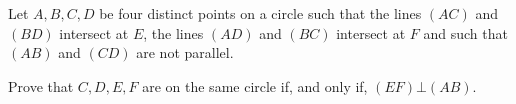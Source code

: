 Let $A,B,C,D$ be four distinct points on a circle such that the lines $(AC)$ and $(BD)$ intersect at $E$,  the lines $(AD)$ and $(BC)$ intersect at $F$ and such that $(AB)$ and $(CD)$ are not parallel.

Prove that $C,D,E,F$ are on the same circle if, and only if, $(EF)\bot(AB)$.